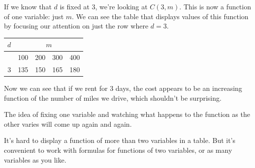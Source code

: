 \begin{example}
\begin{enumerate}[label=(\alph*)]
    \begin{solution}
If we know that $d$ is fixed at 3, we're looking at $C(3,m)$. This is now a function of one variable: just $m$. We can see the table that displays values of this function by focusing our attention on just the row where $d=3$.
\begin{table}[ht!]
\centering
    \begin{tabular}{*{5}{c}}
    $d$ & \multicolumn{4}{c}{$m$} \\
    \toprule
        & 100 & 200 & 300 & 400\\
    \midrule
    3   & 135 & 150 & 165 & 180\\
    \bottomrule
    \end{tabular}
\end{table}
Now we can see that if we rent for 3 days, the cost appears to be an increasing function of the number of miles we drive, which shouldn't be surprising.
    \end{solution}
\end{enumerate}
\end{example}

The idea of fixing one variable and watching what happens to the function as the other varies will come up again and again.

It's hard to display a function of more than two variables in a table. But it's convenient to work with formulas for functions of two variables, or as many variables as you like.


